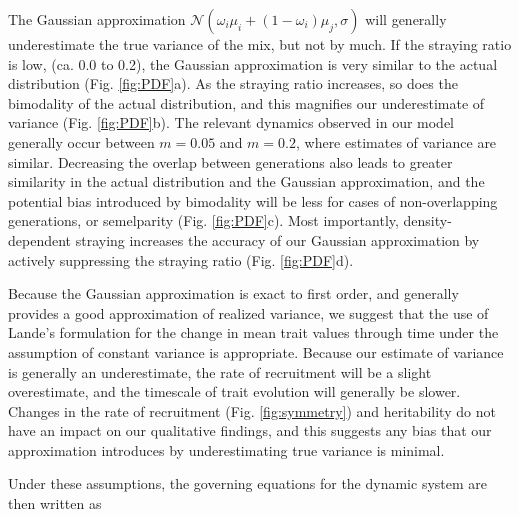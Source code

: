 \documentclass{revtex4}
\begin{document}
The Gaussian approximation $\mathcal{N}(\omega_i\mu_i + (1-\omega_i)\mu_j,\sigma)$ will generally underestimate the true variance of the mix, but not by much.
If the straying ratio is low, (ca. 0.0 to 0.2), the Gaussian approximation is very similar to the actual distribution (Fig. \ref{fig:PDF}a).
As the straying ratio increases, so does the bimodality of the actual distribution, and this magnifies our underestimate of variance (Fig. \ref{fig:PDF}b).
The relevant dynamics observed in our model generally occur between $m=0.05$ and $m=0.2$, where estimates of variance are similar.
Decreasing the overlap between generations also leads to greater similarity in the actual distribution and the Gaussian approximation, and the potential bias introduced by bimodality will be less for cases of non-overlapping generations, or semelparity (Fig. \ref{fig:PDF}c).
Most importantly, density-dependent straying increases the accuracy of our Gaussian approximation by actively suppressing the straying ratio (Fig. \ref{fig:PDF}d).

Because the Gaussian approximation is exact to first order, and generally provides a good approximation of realized variance, we suggest that the use of Lande's formulation for the change in mean trait values through time under the assumption of constant variance is appropriate.
Because our estimate of variance is generally an underestimate, the rate of recruitment will be a slight overestimate, and the timescale of trait evolution will generally be slower.
Changes in the rate of recruitment (Fig. \ref{fig:symmetry}) and heritability do not have an impact on our qualitative findings, and this suggests any bias that our approximation introduces by underestimating true variance is minimal.

Under these assumptions, the governing equations for the dynamic system are then written as
\end{document}
